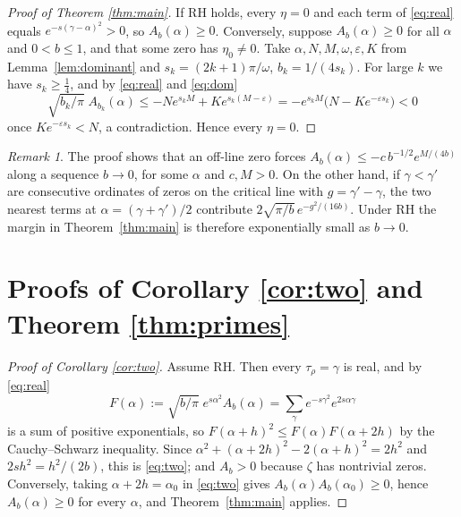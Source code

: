 \documentclass[11pt]{amsart}
\theoremstyle{remark}
\newtheorem{remark}[theorem]{Remark}
\begin{document}
\begin{proof}[Proof of Theorem \ref{thm:main}]
If RH holds, every $\eta=0$ and each term of \eqref{eq:real} equals $e^{-s(\gamma-\alpha)^2}>0$, so $A_b(\alpha)\ge0$.
Conversely, suppose $A_b(\alpha)\ge0$ for all $\alpha$ and $0<b\le1$, and that some zero has $\eta_0\ne0$. Take
$\alpha,N,M,\omega,\varepsilon,K$ from Lemma~\ref{lem:dominant} and $s_k=(2k+1)\pi/\omega$, $b_k=1/(4s_k)$. For large
$k$ we have $s_k\ge\tfrac14$, and by \eqref{eq:real} and \eqref{eq:dom}
\[
\sqrt{b_k/\pi}\;A_{b_k}(\alpha)\le-Ne^{s_kM}+Ke^{s_k(M-\varepsilon)}=-e^{s_kM}\big(N-Ke^{-\varepsilon s_k}\big)<0
\]
once $Ke^{-\varepsilon s_k}<N$, a contradiction. Hence every $\eta=0$.
\end{proof}

\begin{remark}\label{rem:margin}
The proof shows that an off-line zero forces $A_b(\alpha)\le-c\,b^{-1/2}e^{M/(4b)}$ along a sequence $b\to0$,
for some $\alpha$ and $c,M>0$. On the other hand, if $\gamma<\gamma'$ are consecutive ordinates of zeros on the
critical line with $g=\gamma'-\gamma$, the two nearest terms at $\alpha=(\gamma+\gamma')/2$ contribute
$2\sqrt{\pi/b}\,e^{-g^2/(16b)}$. Under RH the margin in Theorem~\ref{thm:main} is therefore exponentially small as
$b\to0$.
\end{remark}

\section{Proofs of Corollary \ref{cor:two} and Theorem \ref{thm:primes}}
\begin{proof}[Proof of Corollary \ref{cor:two}]
Assume RH. Then every $\tau_\rho=\gamma$ is real, and by \eqref{eq:real}
\[
F(\alpha):=\sqrt{b/\pi}\;e^{s\alpha^2}A_b(\alpha)=\sum_\gamma e^{-s\gamma^2}e^{2s\alpha\gamma}
\]
is a sum of positive exponentials, so $F(\alpha+h)^2\le F(\alpha)F(\alpha+2h)$ by the Cauchy--Schwarz inequality. Since
$\alpha^2+(\alpha+2h)^2-2(\alpha+h)^2=2h^2$ and $2sh^2=h^2/(2b)$, this is \eqref{eq:two}; and $A_b>0$ because
$\zeta$ has nontrivial zeros. Conversely, taking $\alpha+2h=\alpha_0$ in \eqref{eq:two} gives
$A_b(\alpha)A_b(\alpha_0)\ge0$, hence $A_b(\alpha)\ge0$ for every $\alpha$, and Theorem~\ref{thm:main} applies.
\end{proof}
\end{document}
